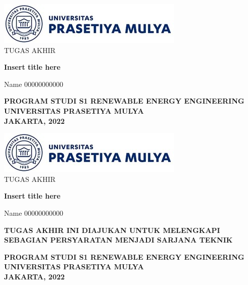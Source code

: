 \begin{center}
        \vspace*{0.5cm}
        \includegraphics{content-headers/img-admin/pmlogo.jpg}\\
        \vspace{1cm}
        {\Large TUGAS AKHIR}\\
        \vspace{1.2cm}
        {\huge \textbf{Insert title here}\par}
        \vspace{0.8cm}
        {\Large Name \hspace{2cm} 00000000000\par}
        \vspace{9cm}
        {\textbf{PROGRAM STUDI S1 RENEWABLE ENERGY ENGINEERING}}\\
        \vspace{0.3cm}
        {\textbf{UNIVERSITAS PRASETIYA MULYA}}\\
        \vspace{0.3cm}
        {\textbf{JAKARTA, 2022}}\\
\end{center}

\newpage
\begin{center}
        \vspace*{0.5cm}
        \includegraphics{content-headers/img-admin/pmlogo.jpg}\\
        \vspace{1cm}
        {\Large TUGAS AKHIR}\\
        \vspace{1.2cm}
        {\huge \textbf{Insert title here}\par}
        \vspace{0.8cm}
        {\Large Name \hspace{2cm} 00000000000\par}
        \vspace{1cm}
        {\textbf{TUGAS AKHIR INI DIAJUKAN UNTUK MELENGKAPI SEBAGIAN PERSYARATAN MENJADI SARJANA TEKNIK}} \par
        \vspace{7cm}
        {\textbf{PROGRAM STUDI S1 RENEWABLE ENERGY ENGINEERING}}\\
        \vspace{0.3cm}
        {\textbf{UNIVERSITAS PRASETIYA MULYA}}\\
        \vspace{0.3cm}
        {\textbf{JAKARTA, 2022}}\\
\end{center}